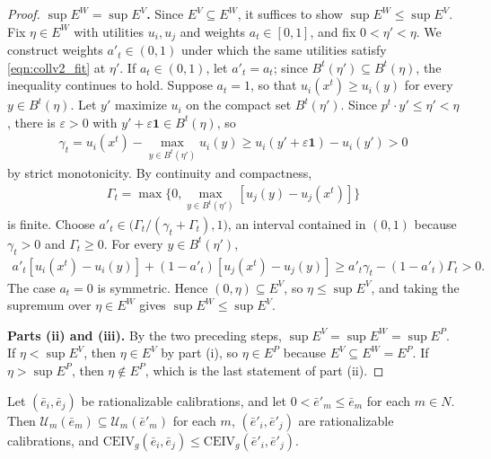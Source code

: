 \documentclass[11 pt]{article}
\begin{document}
\begin{proof}
\textbf{\boldmath$\sup E^{W} = \sup E^{V}$.} Since $E^{V} \subseteq E^{W}$, it suffices to show $\sup E^{W} \leq \sup E^{V}$. Fix $\eta \in E^{W}$ with utilities $u_{i}, u_{j}$ and weights $a_{t} \in [0,1]$, and fix $0 < \eta' < \eta$. We construct weights $a'_{t} \in (0,1)$ under which the same utilities satisfy \eqref{eqn:collv2_fit} at $\eta'$. If $a_{t} \in (0,1)$, let $a'_{t} = a_{t}$; since $B^{t}(\eta') \subseteq B^{t}(\eta)$, the inequality continues to hold. Suppose $a_{t} = 1$, so that $u_{i}(x^{t}) \geq u_{i}(y)$ for every $y \in B^{t}(\eta)$. Let $y'$ maximize $u_{i}$ on the compact set $B^{t}(\eta')$. Since $p^{t} \cdot y' \leq \eta' < \eta$, there is $\varepsilon > 0$ with $y' + \varepsilon \mathbf{1} \in B^{t}(\eta)$, so
\begin{align*}
\gamma_{t} = u_{i}(x^{t}) - \max_{y \in B^{t}(\eta')} u_{i}(y) \geq u_{i}(y' + \varepsilon \mathbf{1}) - u_{i}(y') > 0
\end{align*}
by strict monotonicity. By continuity and compactness,
\begin{align*}
\Gamma_{t} = \max \bigl\{ 0, \max_{y \in B^{t}(\eta')} [ u_{j}(y) - u_{j}(x^{t}) ] \bigr\}
\end{align*}
is finite. Choose $a'_{t} \in \bigl( \Gamma_{t}/(\gamma_{t} + \Gamma_{t}), 1 \bigr)$, an interval contained in $(0,1)$ because $\gamma_{t} > 0$ and $\Gamma_{t} \geq 0$. For every $y \in B^{t}(\eta')$,
\begin{align*}
a'_{t} [ u_{i}(x^{t}) - u_{i}(y) ] + (1 - a'_{t}) [ u_{j}(x^{t}) - u_{j}(y) ] \geq a'_{t} \gamma_{t} - (1 - a'_{t}) \Gamma_{t} > 0.
\end{align*}
The case $a_{t} = 0$ is symmetric. Hence $(0, \eta) \subseteq E^{V}$, so $\eta \leq \sup E^{V}$, and taking the supremum over $\eta \in E^{W}$ gives $\sup E^{W} \leq \sup E^{V}$.

\textbf{Parts (ii) and (iii).} By the two preceding steps, $\sup E^{V} = \sup E^{W} = \sup E^{P}$. If $\eta < \sup E^{V}$, then $\eta \in E^{V}$ by part (i), so $\eta \in E^{P}$ because $E^{V} \subseteq E^{W} = E^{P}$. If $\eta > \sup E^{P}$, then $\eta \notin E^{P}$, which is the last statement of part (ii).
\end{proof}

\begin{lemma}\label{lem:app_calibration}
Let $(\bar e_{i}, \bar e_{j})$ be rationalizable calibrations, and let $0 < \bar e'_{m} \leq \bar e_{m}$ for each $m \in N$. Then $\mathcal{U}_{m}(\bar e_{m}) \subseteq \mathcal{U}_{m}(\bar e'_{m})$ for each $m$, $(\bar e'_{i}, \bar e'_{j})$ are rationalizable calibrations, and $\mathrm{CEIV}_{g}(\bar e_{i}, \bar e_{j}) \leq \mathrm{CEIV}_{g}(\bar e'_{i}, \bar e'_{j})$.
\end{lemma}
\end{document}
